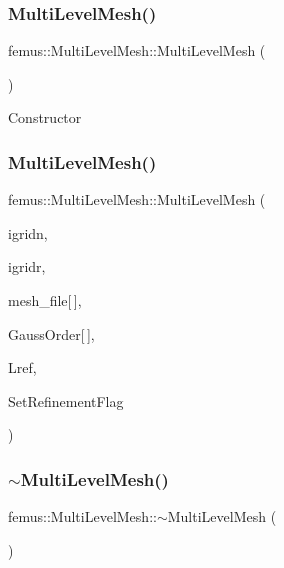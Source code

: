 \subsubsection{\texorpdfstring{Multi\+Level\+Mesh()}{MultiLevelMesh()}\hspace{0.1cm}{\footnotesize\ttfamily [1/2]}}
{\footnotesize\ttfamily femus\+::\+Multi\+Level\+Mesh\+::\+Multi\+Level\+Mesh (\begin{DoxyParamCaption}{ }\end{DoxyParamCaption})}

Constructor \mbox{\label{classfemus_1_1_multi_level_mesh_af4962097722e6de88c1208b0c8d5e803}} 
\subsubsection{\texorpdfstring{Multi\+Level\+Mesh()}{MultiLevelMesh()}\hspace{0.1cm}{\footnotesize\ttfamily [2/2]}}
{\footnotesize\ttfamily femus\+::\+Multi\+Level\+Mesh\+::\+Multi\+Level\+Mesh (\begin{DoxyParamCaption}\item[{const unsigned short \&}]{igridn,  }\item[{const unsigned short \&}]{igridr,  }\item[{const char}]{mesh\+\_\+file\mbox{[}$\,$\mbox{]},  }\item[{const char}]{Gauss\+Order\mbox{[}$\,$\mbox{]},  }\item[{const double}]{Lref,  }\item[{bool($\ast$)(const std\+::vector$<$ double $>$ \&x, const int \&Elem\+Group\+Number, const int \&level)}]{Set\+Refinement\+Flag }\end{DoxyParamCaption})}

\mbox{\label{classfemus_1_1_multi_level_mesh_a0d0d182c59b1829677d6cd5f82265ee4}} 
\subsubsection{\texorpdfstring{$\sim$\+Multi\+Level\+Mesh()}{~MultiLevelMesh()}}
{\footnotesize\ttfamily femus\+::\+Multi\+Level\+Mesh\+::$\sim$\+Multi\+Level\+Mesh (\begin{DoxyParamCaption}{ }\end{DoxyParamCaption})}


